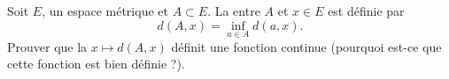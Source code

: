 
\begin{exercice}\label{exo0086}

Soit $E$, un espace métrique et $A\subset E$. La  entre $A$ et $x\in E$ est définie par
\begin{equation}
	d(A,x)=\inf_{a\in A}d(a,x).
\end{equation}
Prouver que la $x\mapsto d(A,x)$ définit une fonction continue (pourquoi est-ce que cette fonction est bien définie ?).

\end{exercice}
